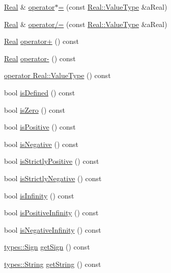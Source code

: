 \begin{DoxyCompactItemize}
\item 
\hyperlink{classlibrary_1_1core_1_1types_1_1_real}{Real} \& \hyperlink{classlibrary_1_1core_1_1types_1_1_real_ae0bdf12b023e5eafaf18e62c7459ccda}{operator$\ast$=} (const \hyperlink{classlibrary_1_1core_1_1types_1_1_real_a9c5c8826b7e5a8e39544d23fea6c0e1c}{Real\+::\+Value\+Type} \&a\+Real)
\item 
\hyperlink{classlibrary_1_1core_1_1types_1_1_real}{Real} \& \hyperlink{classlibrary_1_1core_1_1types_1_1_real_a6a9a6530460f746c7e7fdbba3b6932fe}{operator/=} (const \hyperlink{classlibrary_1_1core_1_1types_1_1_real_a9c5c8826b7e5a8e39544d23fea6c0e1c}{Real\+::\+Value\+Type} \&a\+Real)
\item 
\hyperlink{classlibrary_1_1core_1_1types_1_1_real}{Real} \hyperlink{classlibrary_1_1core_1_1types_1_1_real_a7f39b72df1d66f354dce558a99dc2da5}{operator+} () const
\item 
\hyperlink{classlibrary_1_1core_1_1types_1_1_real}{Real} \hyperlink{classlibrary_1_1core_1_1types_1_1_real_a7a018943c5110e4023f5e462eed70a25}{operator-\/} () const
\item 
\hyperlink{classlibrary_1_1core_1_1types_1_1_real_a04a25244977883708efaa427e411703b}{operator Real\+::\+Value\+Type} () const
\item 
bool \hyperlink{classlibrary_1_1core_1_1types_1_1_real_a424f4e213c63db76b879c294b9126e37}{is\+Defined} () const
\item 
bool \hyperlink{classlibrary_1_1core_1_1types_1_1_real_a7f9a08009b4d5033ff8c9eaa4a6b2c7e}{is\+Zero} () const
\item 
bool \hyperlink{classlibrary_1_1core_1_1types_1_1_real_af2ace2b52781a5e537daef7e6cee6df3}{is\+Positive} () const
\item 
bool \hyperlink{classlibrary_1_1core_1_1types_1_1_real_aa12d6c4d50c80dc184e34d6e52c9dd10}{is\+Negative} () const
\item 
bool \hyperlink{classlibrary_1_1core_1_1types_1_1_real_ac96efb831bb08fd5cfe0f8cfc18ee6b1}{is\+Strictly\+Positive} () const
\item 
bool \hyperlink{classlibrary_1_1core_1_1types_1_1_real_a91029945199886cd83279f29cc225b91}{is\+Strictly\+Negative} () const
\item 
bool \hyperlink{classlibrary_1_1core_1_1types_1_1_real_a4603222d9315aa59355778d66c0b214d}{is\+Infinity} () const
\item 
bool \hyperlink{classlibrary_1_1core_1_1types_1_1_real_a432e5a765554e8656e9bcb6d54f1553d}{is\+Positive\+Infinity} () const
\item 
bool \hyperlink{classlibrary_1_1core_1_1types_1_1_real_a5d7286e45a9f05cda79402c9d8efbc13}{is\+Negative\+Infinity} () const
\item 
\hyperlink{namespacelibrary_1_1core_1_1types_a06d9eaa410d43a0fa3f383040618e87d}{types\+::\+Sign} \hyperlink{classlibrary_1_1core_1_1types_1_1_real_a0e92ad5d5a946dcc64385e1bf47003c8}{get\+Sign} () const
\item 
\hyperlink{classlibrary_1_1core_1_1types_1_1_string}{types\+::\+String} \hyperlink{classlibrary_1_1core_1_1types_1_1_real_ac075065c78713b32a2144756efaae7b0}{get\+String} () const
\end{DoxyCompactItemize}
